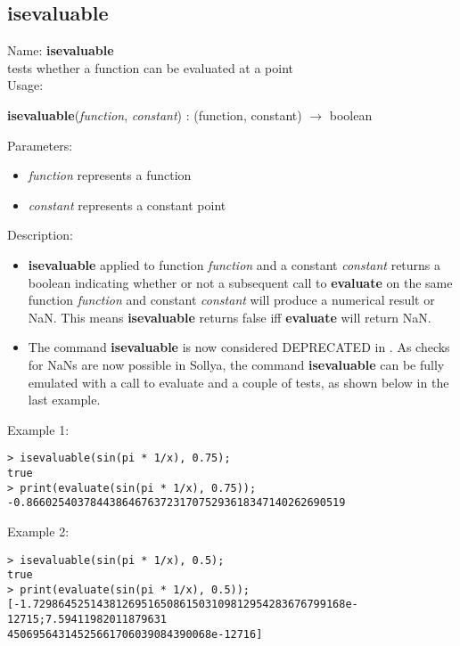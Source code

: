 \subsection{isevaluable}
\label{labisevaluable}
\noindent Name: \textbf{isevaluable}\\
\phantom{aaa}tests whether a function can be evaluated at a point \\[0.2cm]
\noindent Usage: 
\begin{center}
\textbf{isevaluable}(\emph{function}, \emph{constant}) : (\textsf{function}, \textsf{constant}) $\rightarrow$ \textsf{boolean}\\
\end{center}
Parameters: 
\begin{itemize}
\item \emph{function} represents a function
\item \emph{constant} represents a constant point
\end{itemize}
\noindent Description: \begin{itemize}

\item \textbf{isevaluable} applied to function \emph{function} and a constant \emph{constant} returns
   a boolean indicating whether or not a subsequent call to \textbf{evaluate} on the
   same function \emph{function} and constant \emph{constant} will produce a numerical
   result or NaN. This means \textbf{isevaluable} returns false iff \textbf{evaluate} will return NaN.

\item The command \textbf{isevaluable} is now considered DEPRECATED in \sollya.
   As checks for NaNs are now possible in Sollya, the command \textbf{isevaluable}
   can be fully emulated with a call to evaluate and a couple of tests, 
   as shown below in the last example.
\end{itemize}
\noindent Example 1: 
\begin{center}\begin{minipage}{15cm}\begin{Verbatim}[frame=single]
> isevaluable(sin(pi * 1/x), 0.75);
true
> print(evaluate(sin(pi * 1/x), 0.75));
-0.86602540378443864676372317075293618347140262690519
\end{Verbatim}
\end{minipage}\end{center}
\noindent Example 2: 
\begin{center}\begin{minipage}{15cm}\begin{Verbatim}[frame=single]
> isevaluable(sin(pi * 1/x), 0.5);
true
> print(evaluate(sin(pi * 1/x), 0.5));
[-1.7298645251438126951650861503109812954283676799168e-12715;7.59411982011879631
45069564314525661706039084390068e-12716]
\end{Verbatim}
\end{minipage}\end{center}
